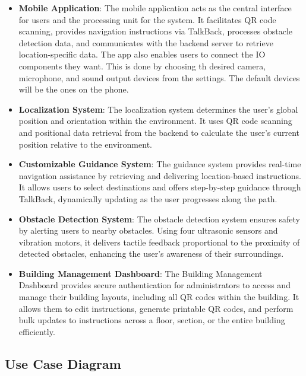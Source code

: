 \begin{itemize}
	\item \textbf{Mobile Application}: The mobile application acts as the central interface for users and the processing unit for the system. It facilitates QR code scanning, provides navigation instructions via TalkBack, processes obstacle detection data, and communicates with the backend server to retrieve location-specific data. The app also enables users to connect the IO components they want. This is done by choosing th desired camera, microphone, and sound output devices from the settings. The default devices will be the ones on the phone.
	
	\item \textbf{Localization System}: The localization system determines the user’s global position and orientation within the environment. It uses QR code scanning and positional data retrieval from the backend to calculate the user’s current position relative to the environment.
	
	\item \textbf{Customizable Guidance System}: The guidance system provides real-time navigation assistance by retrieving and delivering location-based instructions. It allows users to select destinations and offers step-by-step guidance through TalkBack, dynamically updating as the user progresses along the path.
	
	\item \textbf{Obstacle Detection System}: The obstacle detection system ensures safety by alerting users to nearby obstacles. Using four ultrasonic sensors and vibration motors, it delivers tactile feedback proportional to the proximity of detected obstacles, enhancing the user's awareness of their surroundings.


	\item \textbf{Building Management Dashboard}: The Building Management Dashboard provides secure authentication for administrators to access and manage their building layouts, including all QR codes within the building. It allows them to edit instructions, generate printable QR codes, and perform bulk updates to instructions across a floor, section, or the entire building efficiently.
	
\end{itemize}

\subsection{Use Case Diagram}

